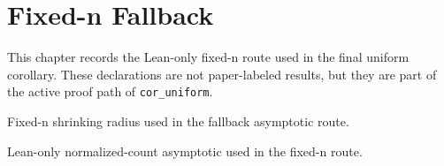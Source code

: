 \section{Fixed-n Fallback}

This chapter records the Lean-only fixed-n route used in the final uniform
corollary. These declarations are not paper-labeled results, but they are part of
the active proof path of \texttt{cor\_uniform}.

\begin{definition}[fixedCountDelta]
\label{lean-fixed-count-delta}
Fixed-n shrinking radius used in the fallback asymptotic route.
\end{definition}

\begin{theorem}
\label{lean-fixed-n-normalized-count}
Lean-only normalized-count asymptotic used in the fixed-n route.
\end{theorem}

